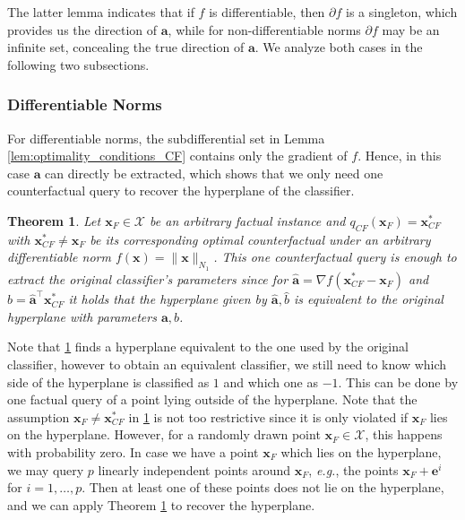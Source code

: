 \documentclass{article}
\newtheorem{theorem}{Theorem}
\begin{document}
The latter lemma indicates that if $f$ is differentiable, then $\partial f$ is a singleton, which provides us the direction of $\bm{a}$, while for non-differentiable norms $\partial f$ may be an infinite set, concealing the true direction of $\bm{a}$. We analyze both cases in the following two subsections.

\subsubsection{Differentiable Norms}
For differentiable norms, the subdifferential set in Lemma \ref{lem:optimality_conditions_CF} contains only the gradient of $f$. Hence, in this case $\bm{a}$ can directly be extracted, which shows that we only need one counterfactual query to recover the hyperplane of the classifier.

\begin{theorem}\label{thm:CF_theorem_diff}
Let $\bm{x}_F\in \mathcal X$ be an arbitrary factual instance and $q_{CF}(\bm{x}_F) = \bm{x}_{CF}^*$ with $\bm{x}_{CF}^*\neq \bm{x}_F$ be its corresponding optimal counterfactual under an arbitrary differentiable norm $f(\bm{x}) = \| \bm{x} \|_{N_1}$.  This one counterfactual query is enough to extract the original classifier's parameters since for $\hat{\bm{a}} = \nabla f(\bm{x}_{CF}^*-\bm{x}_F)$ and $\hat b = \hat{\bm{a}}^\top \bm{x}_{CF}^*$ it holds that the hyperplane given by $\hat{\bm{a}},\hat{b}$ is equivalent to the original hyperplane with parameters $\bm{a},b$.
\end{theorem}
Note that \cref{thm:CF_theorem_diff} finds a hyperplane equivalent to the one used by the original classifier, however to obtain an equivalent classifier, we still need to know which side of the hyperplane is classified as $1$ and which one as $-1$. This can be done by one factual query of a point lying outside of the hyperplane. Note that the assumption $\bm{x}_F\neq \bm{x}_{CF}^*$ in \cref{thm:CF_theorem_diff} is not too restrictive since it is only violated if $\bm{x}_F$ lies on the hyperplane. However, for a randomly drawn point $\bm{x}_F\in \mathcal X$, this happens with probability zero. In case we have a point $\bm{x}_F$ which lies on the hyperplane, we may query $p$ linearly independent points around $\bm{x}_F$, \textit{e.g.}, the points $\bm{x}_F + \bm{e}^i$ for $i=1,\ldots ,p$. Then at least one of these points does not lie on the hyperplane, and we can apply Theorem \ref{thm:CF_theorem_diff} to recover the hyperplane. 
\end{document}
